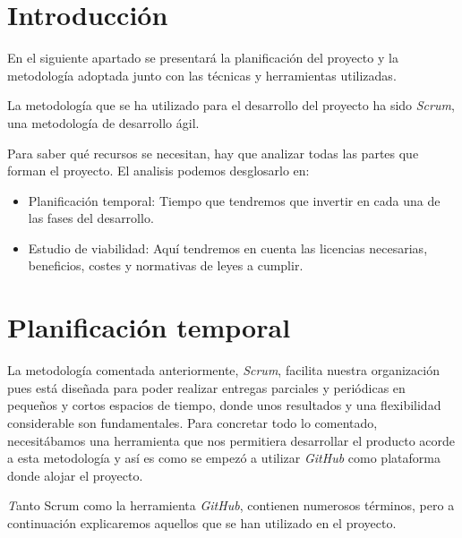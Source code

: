 
\section{Introducción}

En el siguiente apartado se presentará la planificación del proyecto y la metodología adoptada junto con las técnicas y herramientas utilizadas.

La metodología que se ha utilizado para el desarrollo del proyecto ha sido \textit{Scrum}, una metodología de desarrollo ágil.

Para saber qué recursos se necesitan, hay que analizar todas las partes que forman el proyecto. El analisis podemos desglosarlo en:

\begin{itemize}
	\item Planificación temporal: Tiempo que tendremos que invertir en cada una de las fases del desarrollo.
	\item Estudio de viabilidad: Aquí tendremos en cuenta las licencias necesarias, beneficios, costes y normativas de leyes a cumplir.
\end{itemize}


\section{Planificación temporal}

La metodología comentada anteriormente, \textit{Scrum}, facilita nuestra organización pues está diseñada para poder realizar entregas parciales y periódicas en pequeños y cortos espacios de tiempo, donde unos resultados y una flexibilidad considerable son fundamentales. Para concretar todo lo comentado, necesitábamos una herramienta que nos permitiera desarrollar el producto acorde a esta metodología y así es como se empezó a utilizar \textit{GitHub} como plataforma donde alojar el proyecto. 

\textit Tanto {Scrum} como la herramienta \textit{GitHub}, contienen numerosos términos, pero a continuación explicaremos aquellos que se han utilizado en el proyecto.

